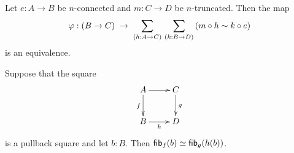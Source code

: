 \documentclass[hott-all.tex]{subfiles}
\begin{document}
%
% 
% 
\begin{thm}
  Let $e:A\to B$ be $n$-connected and $m:C\to D$ be $n$-truncated.
  Then the map
  \[ \varphi: (B\to C) \;\to\; \sm{h:A\to C}{k:B\to D} (m\circ h \htpy k \circ e) \]
  is an equivalence.
\end{thm}
% 
% 
% 
\begin{lem}
Suppose that the square
\begin{equation*}
  \vcenter{\xymatrix{
      A\ar[r]\ar[d]_f &
      C\ar[d]^g\\
      B\ar[r]_-h &
      D
      }}
\end{equation*}
is a pullback square and let $b:B$. Then ${\mathsf{fib}}_{f}(b)\simeq{\mathsf{fib}}_{g}(h(b))$.
\end{lem}
% 
\end{document}
